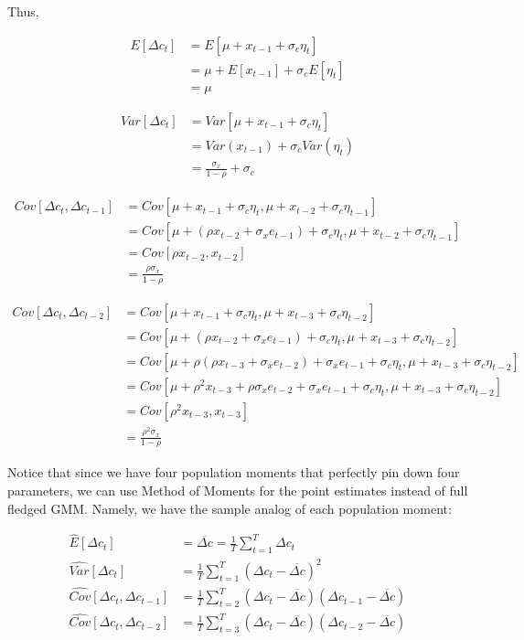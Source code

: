 \documentclass{article}
\begin{document}
\begin{enumerate}
Thus,

\begin{align*}
E[\Delta c_t] 
&= E[\mu + x_{t-1} + \sigma_c \eta_t]\\
&= \mu + E[x_{t-1}] + \sigma_c E[\eta_t]\\
&= \mu
\end{align*}

\begin{align*}
Var[\Delta c_t] 
&= Var[\mu + x_{t-1} + \sigma_c \eta_t] \\
&= Var(x_{t-1}) + \sigma_c Var(\eta_t) \\
&= \frac{\sigma_x}{1-\rho} + \sigma_c
\end{align*}

\begin{align*}
Cov[\Delta c_t, \Delta c_{t-1}] 
&= Cov[\mu + x_{t-1} + \sigma_c \eta_{t}, \mu + x_{t-2} + \sigma_c \eta_{t-1}] \\
&= Cov[\mu + (\rho x_{t-2} + \sigma_x e_{t-1}) + \sigma_c \eta_{t}, \mu + x_{t-2} + \sigma_c \eta_{t-1}] \\
&= Cov[\rho x_{t-2}, x_{t-2}] \\
&= \frac{\rho\sigma_x}{1-\rho}
\end{align*}

\begin{align*}
Cov[\Delta c_t, \Delta c_{t-2}] 
&= Cov[\mu + x_{t-1} + \sigma_c \eta_{t}, \mu + x_{t-3} + \sigma_c \eta_{t-2}] \\
&= Cov[\mu + (\rho x_{t-2} + \sigma_x e_{t-1}) + \sigma_c \eta_{t}, \mu + x_{t-3} + \sigma_c \eta_{t-2}] \\
&= Cov[\mu + \rho (\rho x_{t-3} + \sigma_x e_{t-2}) + \sigma_x e_{t-1} + \sigma_c \eta_{t}, \mu + x_{t-3} + \sigma_c \eta_{t-2}] \\
&= Cov[\mu + \rho^2 x_{t-3} + \rho \sigma_x e_{t-2} + \sigma_x e_{t-1} + \sigma_c \eta_{t}, \mu + x_{t-3} + \sigma_c \eta_{t-2}] \\
&= Cov[ \rho^2 x_{t-3}, x_{t-3}] \\
&= \frac{\rho^2\sigma_x}{1-\rho}
\end{align*}

Notice that since we have four population moments that perfectly pin down four parameters, we can use Method of Moments for the point estimates instead of full fledged GMM.  Namely, we have the sample analog of each population moment:

\begin{align*}
\hat{E}[\Delta c_t]  &= \overline{\Delta c} = \frac{1}{T} \sum_{t=1}^T \Delta c_t\\
\hat{Var}[\Delta c_t] &= \frac{1}{T}\sum_{t=1}^T (\Delta c_t - \overline{\Delta c})^2\\
\hat{Cov}[\Delta c_t, \Delta c_{t-1}] &= \frac{1}{T}\sum_{t=2}^T (\Delta c_t - \overline{\Delta c})(\Delta c_{t-1} - \overline{\Delta c})\\
\hat{Cov}[\Delta c_t, \Delta c_{t-2}] &=\frac{1}{T}\sum_{t=3}^T (\Delta c_t - \overline{\Delta c})(\Delta c_{t-2} - \overline{\Delta c})
\end{align*}


\end{enumerate}
\end{document}
